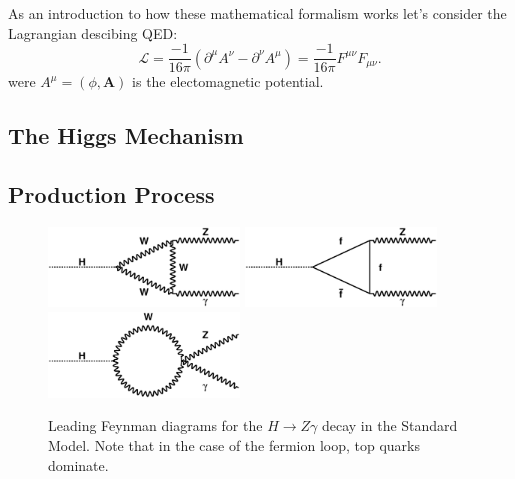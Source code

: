 As an introduction to how these mathematical formalism works let's consider the
Lagrangian descibing QED:
\begin{equation}
\mathcal{L} = \frac{-1}{16\pi}\left(\partial^{\mu} A^{\nu} - \partial^{\nu}A^{\mu}\right) = 
\frac{-1}{16\pi} F^{\mu\nu}F_{\mu\nu}.
\end{equation}
were $A^{\mu} = (\phi, \mathbf{A})$ is the electomagnetic potential.

\subsection{The Higgs Mechanism}
\label{subsec:higgsmec}

\subsection{Production Process}
\label{subsec:prodproc}

\begin{figure}[!htbp]
  \begin{center}
  {\includegraphics[width=2in]{figures/loop1}}
  {\includegraphics[width=2in]{figures/loop2}}
  {\includegraphics[width=2in]{figures/loop3}}
  \caption{Leading Feynman diagrams for the $H\rightarrow Z\gamma$
    decay in the Standard Model. Note that in the case of the fermion
    loop, top quarks dominate.} 
  \label{fig:feynman}
  \end{center}
\end{figure}

